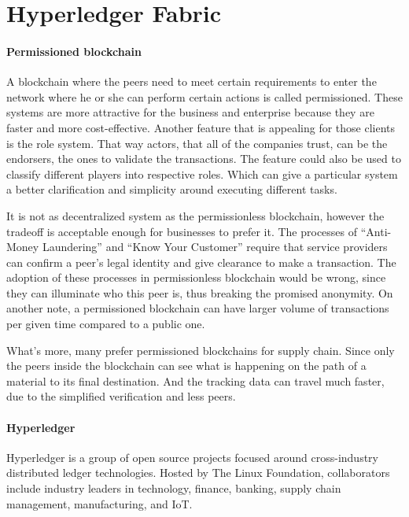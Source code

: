 \documentclass[a4paper,11pt]{report}
\begin{document}
\chapter{Hyperledger Fabric}
\label{hplFabric}

\subsubsection{Permissioned blockchain}
A blockchain where the peers need to meet certain requirements to enter the network where he or she can perform certain actions is called permissioned. These systems are more attractive for the business and enterprise because they are faster and more cost-effective. Another feature that is appealing for those clients is the role system. That way actors, that all of the companies trust, can be the endorsers, the ones to validate the transactions. The feature could also be used to classify different players into respective roles. Which can give a particular system a better clarification and simplicity around executing different tasks. 

	It is not as decentralized system as the permissionless blockchain, however the tradeoff is acceptable enough for businesses to prefer it. The processes of “Anti-Money Laundering” and “Know Your Customer” require that service providers can confirm a peer’s legal identity and give clearance to make a transaction. The adoption of these processes in permissionless blockchain would be wrong, since they can illuminate who this peer is, thus breaking the promised anonymity. On another note, a permissioned blockchain can have larger volume of transactions per given time compared to a public one. 
	
What’s more, many prefer permissioned blockchains for supply chain. Since only the peers inside the blockchain can see what is happening on the path of a material to its final destination. And the tracking data can travel much faster, due to the simplified verification and less peers. 

\subsubsection{Hyperledger}
Hyperledger is a group of open source projects focused around cross-industry distributed ledger technologies. Hosted by The Linux Foundation, collaborators include industry leaders in technology, finance, banking, supply chain management, manufacturing, and IoT.
\end{document}

